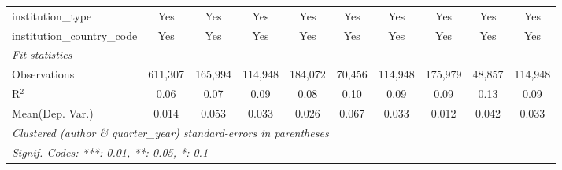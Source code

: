 \begin{tabular}{lccccccccc}
   institution\_type                      & Yes            & Yes            & Yes            & Yes            & Yes            & Yes            & Yes           & Yes            & Yes\\  
   institution\_country\_code             & Yes            & Yes            & Yes            & Yes            & Yes            & Yes            & Yes           & Yes            & Yes\\  
   \midrule
   \emph{Fit statistics}\\
   Observations                           & 611,307        & 165,994        & 114,948        & 184,072        & 70,456         & 114,948        & 175,979       & 48,857         & 114,948\\  
   R$^2$                                  & 0.06           & 0.07           & 0.09           & 0.08           & 0.10           & 0.09           & 0.09          & 0.13           & 0.09\\  
Mean(Dep. Var.) & 0.014 & 0.053 & 0.033 & 0.026 & 0.067 & 0.033 & 0.012 & 0.042 & 0.033 \\
   \midrule \midrule
   \multicolumn{10}{l}{\emph{Clustered (author \& quarter\_year) standard-errors in parentheses}}\\
   \multicolumn{10}{l}{\emph{Signif. Codes: ***: 0.01, **: 0.05, *: 0.1}}\\
\end{tabular}
\par\endgroup
